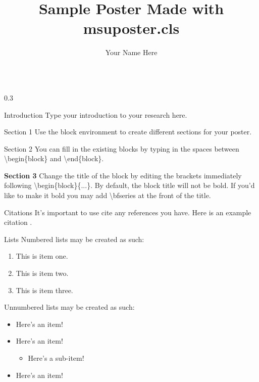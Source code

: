 \documentclass{msuposter}
\title{Sample Poster Made with {\ttfamily msuposter.cls}}
\author{Your Name Here}
\institute{AMS Graduate Student Chapter}
\newcommand{\colwidth}{0.3\linewidth}
\begin{document}
\begin{frame}{}
\begin{columns}[t]

\begin{column}{\colwidth}

\begin{block}{Introduction}
Type your introduction to your research here.
\end{block}

\begin{block}{Section 1}
Use the {\ttfamily block} environment to create different sections for your poster. 
\end{block}

\begin{block}{Section 2} 
You can fill in the existing blocks by typing in the spaces between {\ttfamily\textbackslash begin\{block\}} and {\ttfamily\textbackslash end\{block\}}.
\end{block}

\begin{block}{\bfseries Section 3}
Change the title of the block by editing the brackets immediately following {\ttfamily\textbackslash begin\{block\}\{...\}}.  By default, the block title will not be bold.  If you'd like to make it bold you may add {\ttfamily \textbackslash bfseries} at the front of the title.
\end{block}

\begin{block}{Citations}
It's important to use cite any references you have.  Here is an example citation \cite{cite1}.
\end{block}

\begin{block}{Lists}
Numbered lists may be created as such:
\begin{enumerate}
  \item This is item one.
  \item This is item two.
  \item This is item three.
\end{enumerate}

Unnumbered lists may be created as such:
\begin{itemize}
  \item Here's an item!
  \item Here's an item!
  \begin{itemize}
    \item Here's a sub-item!
  \end{itemize}
  \item Here's an item!
\end{itemize}
\end{block}


\end{column}
\end{columns}
\end{frame}
\end{document}
